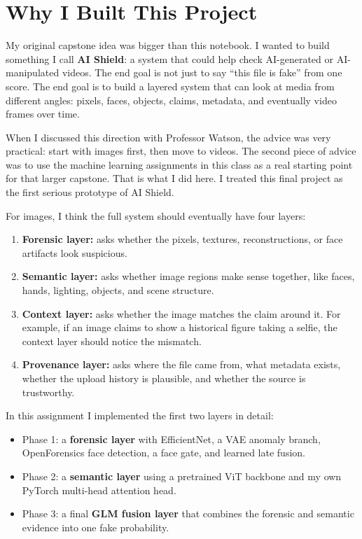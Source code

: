 \documentclass[11pt]{article}
\begin{document}
\newpage
{}
\setcounter{page}{1}
\tableofcontents
\newpage

\section{Why I Built This Project}

My original capstone idea was bigger than this notebook. I wanted to build something I call \textbf{AI Shield}: a system that could help check AI-generated or AI-manipulated videos. The end goal is not just to say ``this file is fake'' from one score. The end goal is to build a layered system that can look at media from different angles: pixels, faces, objects, claims, metadata, and eventually video frames over time.

When I discussed this direction with Professor Watson, the advice was very practical: start with images first, then move to videos. The second piece of advice was to use the machine learning assignments in this class as a real starting point for that larger capstone. That is what I did here. I treated this final project as the first serious prototype of AI Shield.

For images, I think the full system should eventually have four layers:

\begin{enumerate}
    \item \textbf{Forensic layer:} asks whether the pixels, textures, reconstructions, or face artifacts look suspicious.
    \item \textbf{Semantic layer:} asks whether image regions make sense together, like faces, hands, lighting, objects, and scene structure.
    \item \textbf{Context layer:} asks whether the image matches the claim around it. For example, if an image claims to show a historical figure taking a selfie, the context layer should notice the mismatch.
    \item \textbf{Provenance layer:} asks where the file came from, what metadata exists, whether the upload history is plausible, and whether the source is trustworthy.
\end{enumerate}

In this assignment I implemented the first two layers in detail:

\begin{itemize}
    \item Phase 1: a \textbf{forensic layer} with EfficientNet, a VAE anomaly branch, OpenForensics face detection, a face gate, and learned late fusion.
    \item Phase 2: a \textbf{semantic layer} using a pretrained ViT backbone and my own PyTorch multi-head attention head.
    \item Phase 3: a final \textbf{GLM fusion layer} that combines the forensic and semantic evidence into one fake probability.
\end{itemize}
\end{document}

